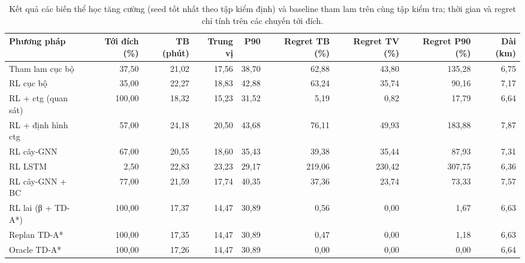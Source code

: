 \begin{table}[!htbp]
\centering
\small
\caption{Kết quả các biến thể học tăng cường (seed tốt nhất theo tập kiểm định) và baseline tham lam trên cùng tập kiểm tra; thời gian và regret chỉ tính trên các chuyến tới đích.}
\label{tab:tab_main_rl}
\begin{adjustbox}{max width=\linewidth}
\begin{tabular}{lrrrrrrrr}
\toprule
Phương pháp & Tới đích (\%) & TB (phút) & Trung vị & P90 & Regret TB (\%) & Regret TV (\%) & Regret P90 (\%) & Dài (km) \\
\midrule
Tham lam cục bộ & 37{,}50 & 21{,}02 & 17{,}56 & 38{,}70 & 62{,}88 & 43{,}80 & 135{,}28 & 6{,}75 \\
RL cục bộ & 35{,}00 & 22{,}27 & 18{,}83 & 42{,}88 & 63{,}24 & 35{,}74 & 90{,}16 & 7{,}17 \\
RL + ctg (quan sát) & 100{,}00 & 18{,}32 & 15{,}23 & 31{,}52 & 5{,}19 & 0{,}82 & 17{,}79 & 6{,}64 \\
RL + định hình ctg & 57{,}00 & 24{,}18 & 20{,}50 & 43{,}68 & 76{,}11 & 49{,}93 & 183{,}88 & 7{,}87 \\
RL cây-GNN & 67{,}00 & 20{,}55 & 18{,}60 & 35{,}43 & 39{,}38 & 35{,}44 & 87{,}93 & 7{,}31 \\
RL LSTM & 2{,}50 & 22{,}83 & 23{,}23 & 29{,}17 & 219{,}06 & 230{,}42 & 307{,}75 & 6{,}36 \\
RL cây-GNN + BC & 77{,}00 & 21{,}59 & 17{,}74 & 40{,}35 & 37{,}36 & 23{,}74 & 73{,}33 & 7{,}57 \\
RL lai (β + TD-A*) & 100{,}00 & 17{,}37 & 14{,}47 & 30{,}89 & 0{,}56 & 0{,}00 & 1{,}67 & 6{,}63 \\
Replan TD-A* & 100{,}00 & 17{,}35 & 14{,}47 & 30{,}89 & 0{,}47 & 0{,}00 & 1{,}18 & 6{,}63 \\
Oracle TD-A* & 100{,}00 & 17{,}26 & 14{,}47 & 30{,}89 & 0{,}00 & 0{,}00 & 0{,}00 & 6{,}64 \\
\bottomrule
\end{tabular}
\end{adjustbox}
\end{table}
